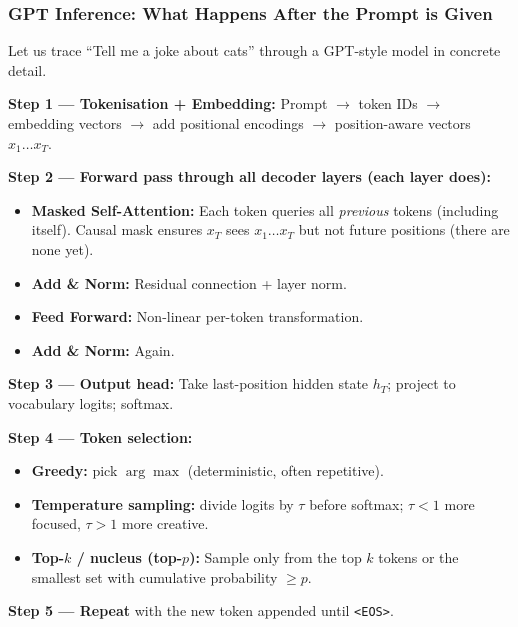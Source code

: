 \begin{frame}[fragile]\frametitle{GPT Inference: What Happens After the Prompt is Given}

Let us trace ``Tell me a joke about cats'' through a GPT-style model in concrete detail.

\textbf{Step 1 --- Tokenisation + Embedding:}
Prompt $\to$ token IDs $\to$ embedding vectors $\to$ add positional encodings $\to$ position-aware vectors $x_1 \ldots x_T$.

\textbf{Step 2 --- Forward pass through all decoder layers (each layer does):}
\begin{itemize}
\item \textbf{Masked Self-Attention:} Each token queries all \emph{previous} tokens (including itself). Causal mask ensures $x_T$ sees $x_1 \ldots x_T$ but not future positions (there are none yet).
\item \textbf{Add \& Norm:} Residual connection + layer norm.
\item \textbf{Feed Forward:} Non-linear per-token transformation.
\item \textbf{Add \& Norm:} Again.
\end{itemize}

\textbf{Step 3 --- Output head:} Take last-position hidden state $h_T$; project to vocabulary logits; softmax.

\textbf{Step 4 --- Token selection:}
\begin{itemize}
\item \textbf{Greedy:} pick $\arg\max$ (deterministic, often repetitive).
\item \textbf{Temperature sampling:} divide logits by $\tau$ before softmax; $\tau < 1$ more focused, $\tau > 1$ more creative.
\item \textbf{Top-$k$ / nucleus (top-$p$):} Sample only from the top $k$ tokens or the smallest set with cumulative probability $\geq p$.
\end{itemize}

\textbf{Step 5 --- Repeat} with the new token appended until \texttt{<EOS>}.

\end{frame}

